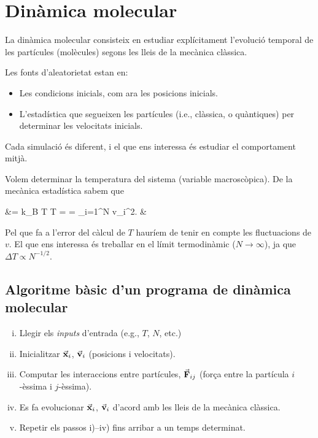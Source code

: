 \section{Dinàmica molecular}
La dinàmica molecular consisteix en estudiar explícitament l'evolució temporal de les partícules (molècules) segons les lleis de la mecànica clàssica.

Les fonts d'aleatorietat estan en:
\begin{itemize}
	\item Les condicions inicials, com ara les posicions inicials.
	\item L'estadística que segueixen les partícules (i.e., clàssica, o quàntiques) per determinar les velocitats inicials.
\end{itemize}
Cada simulació és diferent, i el que ens interessa és estudiar el comportament mitjà.

\begin{example}\label{ex:temperature}
	Volem determinar la temperatura del sistema (variable macroscòpica). De la mecànica estadística sabem que
	\begin{flalign*}
		 &=  k_{B} T \Rightarrow T =   =   \sum_{i=1}^{N} v_{i}^{2}. &
	\end{flalign*}
	Pel que fa a l'error del càlcul de $T$ hauríem de tenir en compte les fluctuacions de $v$. El que ens interessa és treballar en el límit termodinàmic ($N \to \infty$), ja que $\Delta T \propto N^{-1/2}$.
\end{example}

\subsection{Algoritme bàsic d'un programa de dinàmica molecular}
\begin{enumerate}[i)]
	\item Llegir els \emph{inputs} d'entrada (e.g., $T$, $N$, etc.)
	\item Inicialitzar $\va{x}_{i}$, $\va{v}_{i}$ (posicions i velocitats).
	\item Computar les interaccions entre partícules, $\va{F}_{ij}$ (força entre la partícula $i$-èssima i $j$-èssima).
	\item Es fa evolucionar $\va{x}_{i}$, $\va{v}_{i}$ d'acord amb les lleis de la mecànica clàssica.
	\item Repetir els passos i)--iv) fins arribar a un temps determinat.
\end{enumerate}


